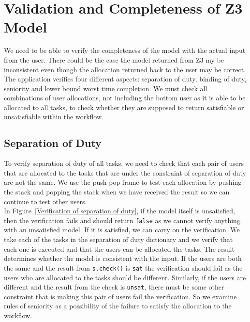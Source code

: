 \documentclass[a4paper]{report}
\begin{document}
\section{Validation and Completeness of Z3 Model}
We need to be able to verify the completeness of the model with the actual input from the user. There could be the case the model returned from Z3 my be inconsistent even though the allocation returned back to the user may be correct. The application verifies four different aspects: separation of duty, binding of duty, seniority and lower bound worst time completion. We must check all combinations of user allocations, not including the bottom user as it is able to be allocated to all tasks, to check whether they are supposed to return satisfiable or unsatisfiable within the workflow.\\

\subsection{Separation of Duty}
To verify separation of duty of all tasks, we need to check that each pair of users that are allocated to the tasks that are under the constraint of separation of duty are not the same. We use the push-pop frame to test each allocation by pushing the stack and popping the stack when we have received the result so we can continue to test other users. \\

In Figure~\ref{Verification of separation of duty}, if the model itself is unsatisfied, then the verification fails and should return \texttt{false} as we cannot verify anything with an unsatisfied model. If it is satisfied, we can carry on the verification. We take each of the tasks in the separation of duty dictionary and we verify that each one is executed and that the users can be allocated the tasks. The result determines whether the model is consistent with the input. If the users are both the same and the result from \texttt{s.check()} is \texttt{sat} the verification should fail as the users who are allocated to the tasks should be different. Similarly, if the users are different and the result from the check is \texttt{unsat}, there must be some other constraint that is making this pair of users fail the verification. So we examine rules of seniority as a possibility of the failure to satisfy the allocation to the workflow. 
\end{document}
